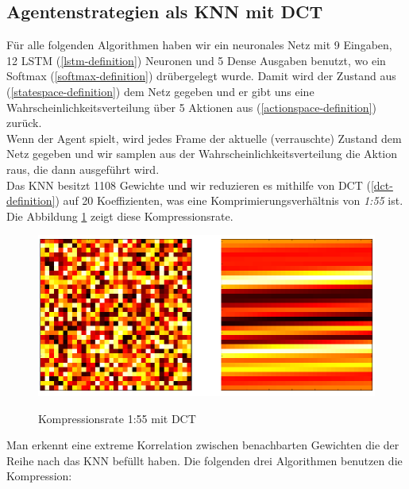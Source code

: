         \subsection{Agentenstrategien als KNN mit DCT} \label{knn-dct-impl}
        Für alle folgenden Algorithmen haben wir ein neuronales Netz mit 9 Eingaben, 12 LSTM (\ref{lstm-definition}) Neuronen und 5 Dense Ausgaben benutzt, wo ein Softmax (\ref{softmax-definition}) drübergelegt wurde. Damit wird der Zustand aus (\ref{statespace-definition}) dem Netz gegeben und er gibt uns eine Wahrscheinlichkeitsverteilung über 5 Aktionen aus (\ref{actionspace-definition}) zurück.\\[2mm]
        \noindent
        Wenn der Agent spielt, wird jedes Frame der aktuelle (verrauschte) Zustand dem Netz gegeben und wir samplen aus der Wahrscheinlichkeitsverteilung die Aktion raus, die dann ausgeführt wird. \\[2mm]
        \noindent
        Das KNN besitzt 1108 Gewichte und wir reduzieren es mithilfe von DCT (\ref{dct-definition}) auf 20 Koeffizienten, was eine Komprimierungsverhältnis von \textit{1:55} ist. Die Abbildung \ref{fig:dct-my-case} zeigt diese Kompressionsrate.\\

        \begin{figure}[H]
            \begin{center}
                \includegraphics[scale=0.35]{../pictures/DCT-my-case-cropped.png}\\
                \caption{Kompressionsrate 1:55 mit DCT}\label{fig:dct-my-case}
            \end{center}
        \end{figure}

        \noindent
        Man erkennt eine extreme Korrelation zwischen benachbarten Gewichten die der Reihe nach das KNN befüllt haben. Die folgenden drei Algorithmen benutzen die Kompression:

